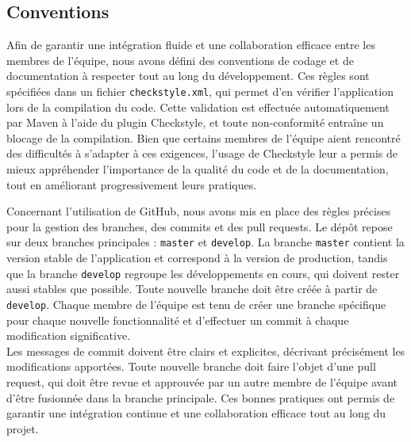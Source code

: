 \subsection{Conventions}  

\hypertarget{checkstyledescription}{  
    Afin de garantir une intégration fluide et une collaboration efficace entre les membres de l’équipe, nous avons défini des conventions de codage et de documentation à respecter tout au long du développement. Ces règles sont spécifiées dans un fichier \texttt{checkstyle.xml}, qui permet d’en vérifier l’application lors de la compilation du code. Cette validation est effectuée automatiquement par Maven à l’aide du plugin Checkstyle, et toute non-conformité entraîne un blocage de la compilation. Bien que certains membres de l’équipe aient rencontré des difficultés à s’adapter à ces exigences, l’usage de Checkstyle leur a permis de mieux appréhender l’importance de la qualité du code et de la documentation, tout en améliorant progressivement leurs pratiques. \\  
}  

Concernant l’utilisation de GitHub, nous avons mis en place des règles précises pour la gestion des branches, des commits et des pull requests. Le dépôt repose sur deux branches principales : \texttt{master} et \texttt{develop}. La branche \texttt{master} contient la version stable de l’application et correspond à la version de production, tandis que la branche \texttt{develop} regroupe les développements en cours, qui doivent rester aussi stables que possible. Toute nouvelle branche doit être créée à partir de \texttt{develop}. Chaque membre de l’équipe est tenu de créer une branche spécifique pour chaque nouvelle fonctionnalité et d’effectuer un commit à chaque modification significative. \\  

Les messages de commit doivent être clairs et explicites, décrivant précisément les modifications apportées. Toute nouvelle branche doit faire l’objet d’une pull request, qui doit être revue et approuvée par un autre membre de l’équipe avant d’être fusionnée dans la branche principale. Ces bonnes pratiques ont permis de garantir une intégration continue et une collaboration efficace tout au long du projet. \\  
